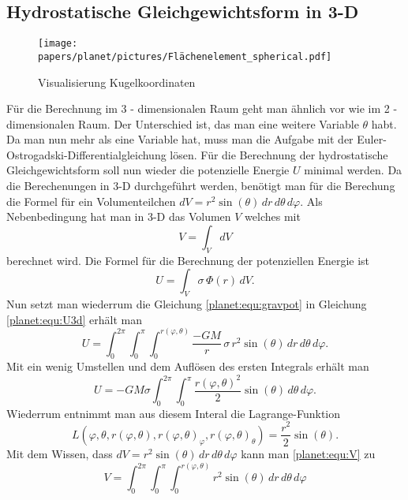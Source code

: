 \subsection{Hydrostatische Gleichgewichtsform in 3-D}
\begin{figure}
	\centering
	\texttt{[image: papers/planet/pictures/Flächenelement\_spherical.pdf]}
	\caption{Visualisierung Kugelkoordinaten}
\end{figure}
Für die Berechnung im 3 - dimensionalen Raum geht man ähnlich vor wie im 2 - dimensionalen Raum.
Der Unterschied ist, das man eine weitere Variable \(\theta\) habt.
Da man nun mehr als eine Variable hat, muss man die Aufgabe mit der Euler-Ostrogadski-Differentialgleichung lösen.
Für die Berechnung der hydrostatische Gleichgewichtsform soll nun wieder die potenzielle Energie \(U\) minimal werden.
Da die Berechenungen in 3-D durchgeführt werden, benötigt man für die Berechung die Formel für ein Volumenteilchen \(dV = r^2 \sin (\theta) \, dr \, d\theta \, d\varphi \).
Als Nebenbedingung hat man in 3-D das Volumen \(V\) welches mit 
\begin{equation}
	V = \int_{V}^{} dV
	\label{planet:equ:V}
\end{equation}
berechnet wird.
Die Formel für die Berechnung der potenziellen Energie ist
\begin{equation}
	U = \int_{V} \sigma \,  \Phi (r)\, dV.
	\label{planet:equ:U3d}
\end{equation}
Nun setzt man wiederrum die Gleichung \eqref{planet:equ:gravpot} in Gleichung \eqref{planet:equ:U3d} erhält man
\begin{equation*}
	U = \int_{0}^{2\pi}
	\int_{0}^{\pi}
	\int_{0}^{r(\varphi,\theta)}
	\frac{-GM}{r}\, \sigma\, r^2 \sin (\theta) \,
	dr \, d\theta \, d\varphi.
\end{equation*}
Mit ein wenig Umstellen und dem Auflösen des ersten Integrals erhält man
\begin{equation*}
	U =-GM\sigma \int_{0}^{2\pi}\int_{0}^{\pi}\frac{r(\varphi,\theta)^2}{2}  \sin (\theta) \, d\theta \, d\varphi.
\end{equation*}
Wiederrum entnimmt man aus diesem Interal die Lagrange-Funktion
\begin{equation*}
	L(\varphi,\theta ,r(\varphi,\theta),r(\varphi,\theta)_\varphi,r(\varphi,\theta)_\theta) = \frac{r^2}{2}  \sin (\theta).
\end{equation*}
Mit dem Wissen, dass \(dV = r^2 \sin (\theta) \, dr \, d\theta \, d\varphi \) kann man \eqref{planet:equ:V} zu
\begin{equation*}
	V = \int_{0}^{2\pi}\int_{0}^{\pi}\int_{0}^{r(\varphi,\theta)} r^2 \sin (\theta) \, dr \, d\theta \, d\varphi
\end{equation*}
